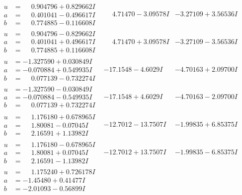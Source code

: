\documentclass[1p]{elsarticle_modified}
\theoremstyle{definition}
\begin{document}
$$\begin{array}{c|c|c}
\begin{aligned}
u &= \phantom{-}0.904796 + 0.829662 I \\
a &= \phantom{-}0.401041 - 0.496617 I \\
b &= \phantom{-}0.774885 - 0.116608 I\end{aligned}
 & \phantom{-}4.71470 - 3.09578 I & -3.27109 + 3.56536 I \\ \hline\begin{aligned}
u &= \phantom{-}0.904796 - 0.829662 I \\
a &= \phantom{-}0.401041 + 0.496617 I \\
b &= \phantom{-}0.774885 + 0.116608 I\end{aligned}
 & \phantom{-}4.71470 + 3.09578 I & -3.27109 - 3.56536 I \\ \hline\begin{aligned}
u &= -1.327590 + 0.030849 I \\
a &= -0.070884 + 0.549935 I \\
b &= \phantom{-}0.077139 - 0.732274 I\end{aligned}
 & -17.1548 - 4.6029 I & -4.70163 + 2.09700 I \\ \hline\begin{aligned}
u &= -1.327590 - 0.030849 I \\
a &= -0.070884 - 0.549935 I \\
b &= \phantom{-}0.077139 + 0.732274 I\end{aligned}
 & -17.1548 + 4.6029 I & -4.70163 - 2.09700 I \\ \hline\begin{aligned}
u &= \phantom{-}1.176180 + 0.678965 I \\
a &= \phantom{-}1.80081 - 0.07045 I \\
b &= \phantom{-}2.16591 + 1.13982 I\end{aligned}
 & -12.7012 - 13.7507 I & -1.99835 + 6.85375 I \\ \hline\begin{aligned}
u &= \phantom{-}1.176180 - 0.678965 I \\
a &= \phantom{-}1.80081 + 0.07045 I \\
b &= \phantom{-}2.16591 - 1.13982 I\end{aligned}
 & -12.7012 + 13.7507 I & -1.99835 - 6.85375 I \\ \hline\begin{aligned}
u &= \phantom{-}1.175240 + 0.726178 I \\
a &= -1.45480 + 0.41477 I \\
b &= -2.01093 - 0.56899 I\end{aligned}

\end{array}$$
\end{document}
